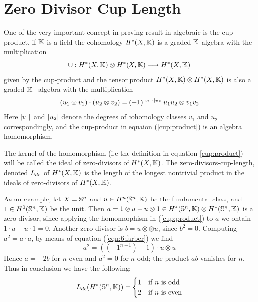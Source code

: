 \section{Zero Divisor Cup Length}

One of the very important concept in proving result in algebraic is the cup-product, if $\mathbb{K}$ is a field the cohomology $H^*(X, \mathbb{K})$ is a graded $\mathbb{K}$-algebra with the multiplication
\begin{equation}\label{cup:product}
    \cup: H^*(X, \mathbb{K}) \otimes H^*(X, \mathbb{K}) \longrightarrow H^*(X, \mathbb{K})
\end{equation}
given by the cup-product and the tensor product $H^*(X, \mathbb{K}) \otimes H^*(X, \mathbb{K})$ is also a graded $\mathbb{K}-$algebra with the multiplication
\begin{equation}\label{eqn:6:farber}
    (u_1 \otimes v_1) \cdot (u_2 \otimes v_2) = (-1)^{\lvert v_1\rvert \cdot \lvert u_2\rvert} u_1 u_2 \otimes v_1v_2
\end{equation}
Here $\lvert v_1\rvert$ and $\lvert u_2\rvert$ denote the degrees of cohomology classes $v_1$ and $u_2$ correspondingly, and the cup-product in equaion (\ref{cup:product}) is an algebra homomorphism.

\begin{defn}
    The kernel of the homomorphism (i.e the definition in equation \ref{cup:product}) will be called the ideal of zero-divisors of $H^*(X, \mathbb{K})$. The zero-divisors-cup-length, denoted $L_{dc}$ of $H^*(X, \mathbb{K})$ is the length of the longest nontrivial product in the ideals of zero-divisors of $H^*(X, \mathbb{K})$.
\end{defn}
As an example, let $X = \mathbb{S}^n$ and $u \in H^n(\mathbb{S}^n, \mathbb{K})$ be the fundamental class, and $1 \in H^0(\mathbb{S}^n, \mathbb{K})$ be the unit. Then $a = 1 \otimes u - u \otimes 1 \in H^*(\mathbb{S}^n, \mathbb{K}) \otimes H^*(\mathbb{S}^n, \mathbb{K})$ is a zero-divisor, since applying the homomorphism in (\ref{cup:product}) to $a$ we ontain $1 \cdot u - u\cdot 1 = 0$. Another zero-divisor is $b = u \otimes \otimes u$, since $b^2 = 0$. Computing $a^2 = a \cdot a$, by means of equation (\ref{eqn:6:farber}) we find
\[
    a^2 = \left((-1^{n-1}) - 1\right) \cdot u \otimes u  
\]
Hence $a = - 2b$ for $n$ even and $a^2 = 0$ for $n$ odd; the product $ab$ vanishes for $n$. Thus in conclusion we have the following:
\begin{equation}\label{zdcl:of:sphere}
    L_{dc}(H^*(\mathbb{S}^n, \mathbb{K})) = \begin{cases}
        1 & \text{if $n$ is odd} \\
        2 & \text{if $n$ is even}
    \end{cases}  
\end{equation}



